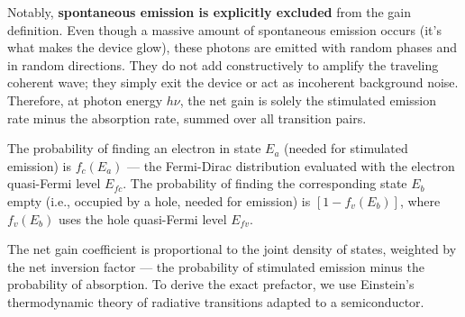 Notably, \textbf{spontaneous emission is explicitly excluded} from the gain definition. Even though a massive amount of spontaneous emission occurs (it's what makes the device glow), these photons are emitted with random phases and in random directions. They do not add constructively to amplify the traveling coherent wave; they simply exit the device or act as incoherent background noise. Therefore, at photon energy $h\nu$, the net gain is solely the stimulated emission rate minus the absorption rate, summed over all transition pairs.

The probability of finding an electron in state $E_a$ (needed for stimulated emission) is $f_c(E_a)$ — the Fermi-Dirac distribution evaluated with the electron quasi-Fermi level $E_{fc}$. The probability of finding the corresponding state $E_b$ empty (i.e., occupied by a hole, needed for emission) is $[1 - f_v(E_b)]$, where $f_v(E_b)$ uses the hole quasi-Fermi level $E_{fv}$.

The net gain coefficient is proportional to the joint density of states, weighted by the net inversion factor — the probability of stimulated emission minus the probability of absorption. To derive the exact prefactor, we use Einstein's thermodynamic theory of radiative transitions adapted to a semiconductor.

